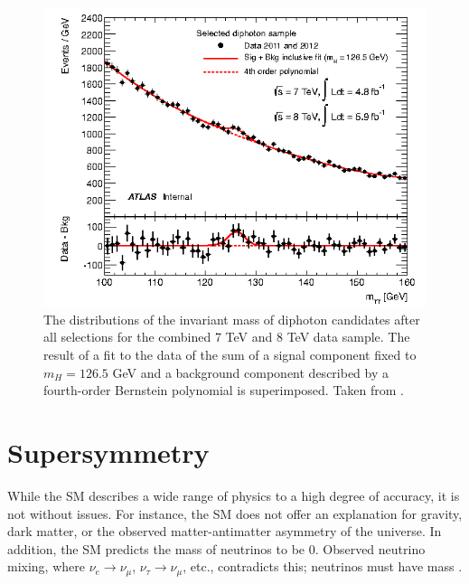 		\begin{figure}[!ht]
		\centering
		\includegraphics[width=.7\textwidth,keepaspectratio=true]{chapters/chapter2_theory/images/Higgs_Discovery_gam_gam.jpeg}
		\caption{The distributions of the invariant mass of diphoton candidates after all selections for the combined 7 TeV and 8 TeV data sample. The result of a fit to the data of the sum of a signal component fixed to $m_H=126.5$ GeV  and a background component described by a fourth-order Bernstein polynomial is superimposed. Taken from \cite{higgs-discovery-atlas}.}
		\label{fig:higgs-discovery}
		\end{figure}

\section{Supersymmetry}\label{sec:SUSY}
	While the \gls{SM} describes a wide range of physics to a high degree of accuracy, it is not without issues. For instance, the \gls{SM} does not offer an explanation for gravity, dark matter, or the observed matter-antimatter asymmetry of the universe. In addition, the \gls{SM} predicts the mass of neutrinos to be 0. Observed neutrino mixing, where $\nu_e \to \nu_\mu$, $\nu_\tau \to \nu_\mu$, etc., contradicts this; neutrinos must have mass \cite{pdg}.

